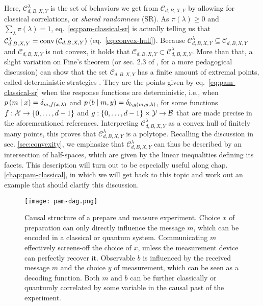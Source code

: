             Here, $\mathcal{C}_{d,B,X,Y}^\lambda$ is the set of behaviors we get from $\mathcal{C}_{d,B,X,Y}$ by allowing for classical correlations, or \emph{shared randomness} (SR). As $\pi(\lambda) \geq 0$ and $\sum_\lambda \pi(\lambda) = 1$, eq.~\eqref{eq:pam-classical-sr} is actually telling us that $\mathcal{C}_{d,B,X,Y}^\lambda = \text{conv} \left( \mathcal{C}_{d,B,X,Y} \right)$ (eq.~\eqref{eq:convex-hull}). Because $\mathcal{C}_{d,B,X,Y}^\lambda \subseteq \mathcal{C}_{d,B,X,Y}$ and $\mathcal{C}_{d,B,X,Y}$ is not convex, it holds that $\mathcal{C}_{d,B,X,Y} \subset \mathcal{C}^\lambda_{d,B,X,Y}$. More than that, a slight variation on Fine's theorem \cite{fine_hidden_1982} (or sec. 2.3 of \cite{scarani_bell_2019}, for a more pedagogical discussion) can show that the set $\mathcal{C}_{d,B,X,Y}$ has a finite amount of extremal points, called deterministic strategies \cite{gallego_pam_2010,de_vicente_bound_2019}. They are the points given by eq.~\eqref{eq:pam-classical-sr} when the response functions are deterministic, i.e., when $p \left( m \mid x \right) = \delta_{m,f(x,\lambda)}$ and $ p \left( b \mid m,y \right) = \delta_{b,g(m,y,\lambda)}$, for some functions $f : \mathcal{X} \rightarrow \{ 0, \ldots, d-1 \}$ and $g : \{ 0, \ldots, d-1 \} \times \mathcal{Y} \rightarrow \mathcal{B}$ that are made precise in the aforementioned references. Interpreting $\mathcal{C}_{d,B,X,Y}^\lambda$ as a convex hull of finitely many points, this proves that $\mathcal{C}_{d,B,X,Y}^\lambda$ is a polytope. Recalling the discussion in sec. \ref{sec:convexity}, we emphasize that $\mathcal{C}_{d,B,X,Y}^\lambda$ can thus be described by an intersection of half-spaces, which are given by the linear inequalities defining its facets. This description will turn out to be especially useful along chap. \ref{chap:pam-classical}, in which we will get back to this topic and work out an example that should clarify this discussion.

			\begin{figure}
				\begin{minipage}[c]{0.31\textwidth}
					\centering
					\texttt{[image: pam-dag.png]}
				\end{minipage}
				\begin{minipage}[c]{0.68\textwidth}
					\caption{Causal structure of a prepare and measure experiment. Choice $x$ of preparation can only directly influence the message $m$, which can be encoded in a classical or quantum system. Communicating $m$ effectively screens-off the choice of $x$, unless the measurement device can perfectly recover it. Observable $b$ is influenced by the received message $m$ and the choice $y$ of measurement, which can be seen as a decoding function. Both $m$ and $b$ can be further classically or quantumly correlated by some variable in the causal past of the experiment.}	
					\label{fig:pam-dag}
				\end{minipage}
			\end{figure}
            
